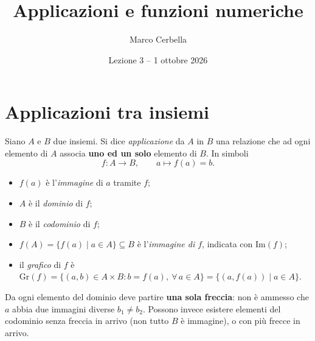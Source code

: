 \documentclass[11pt,a4paper]{article}
\title{Applicazioni e funzioni numeriche}
\author{Marco Cerbella}
\date{Lezione 3 -- 1 ottobre 2026}
\begin{document}
\maketitle

\section{Applicazioni tra insiemi}

\begin{definizione}
Siano $A$ e $B$ due insiemi. Si dice \emph{applicazione} da $A$ in $B$ una relazione che ad ogni elemento di $A$ associa \textbf{uno ed un solo} elemento di $B$. In simboli
\[
f : A \to B, \qquad a \mapsto f(a) = b.
\]
\end{definizione}

\begin{itemize}
    \item $f(a)$ è l'\emph{immagine} di $a$ tramite $f$;
    \item $A$ è il \emph{dominio} di $f$;
    \item $B$ è il \emph{codominio} di $f$;
    \item $f(A) = \{f(a) \mid a \in A\} \subseteq B$ è l'\emph{immagine di $f$}, indicata con $\mathrm{Im}(f)$;
    \item il \emph{grafico} di $f$ è
    $\mathrm{Gr}(f) = \{(a, b) \in A \times B : b = f(a),\ \forall\, a \in A\} = \{(a, f(a)) \mid a \in A\}$.
\end{itemize}

\begin{osservazione}
Da ogni elemento del dominio deve partire \textbf{una sola freccia}: non è ammesso che $a$ abbia due immagini diverse $b_1 \neq b_2$. Possono invece esistere elementi del codominio senza freccia in arrivo (non tutto $B$ è immagine), o con più frecce in arrivo.
\end{osservazione}

\begin{center}
\end{center}
\end{document}
